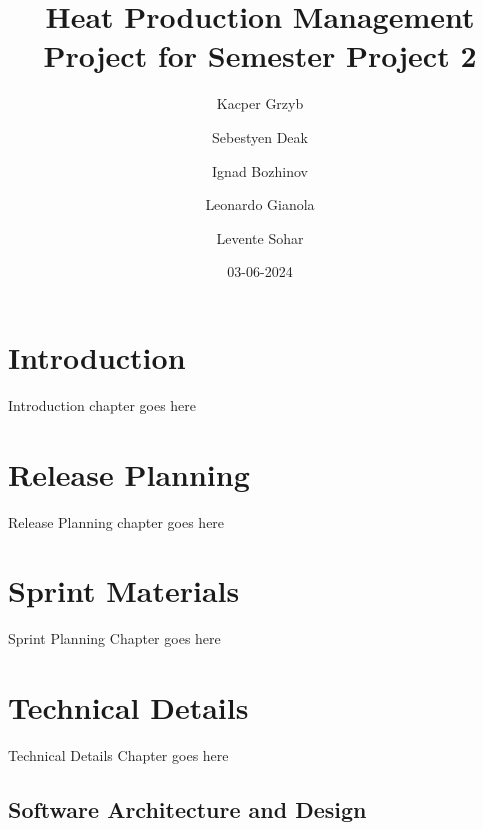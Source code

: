 \documentclass[12pt]{report}
\title{Heat Production Management Project for Semester Project 2}
\author{Kacper Grzyb \and Sebestyen Deak \and Ignad Bozhinov \and Leonardo Gianola \and Levente Sohar}
\date{03-06-2024}
\begin{document}
\maketitle

\tableofcontents

\chapter{Introduction}
Introduction chapter goes here

\chapter{Release Planning}
Release Planning chapter goes here

\chapter{Sprint Materials}
Sprint Planning Chapter goes here

\chapter{Technical Details}
Technical Details Chapter goes here

\section{Software Architecture and Design}
\end{document}
